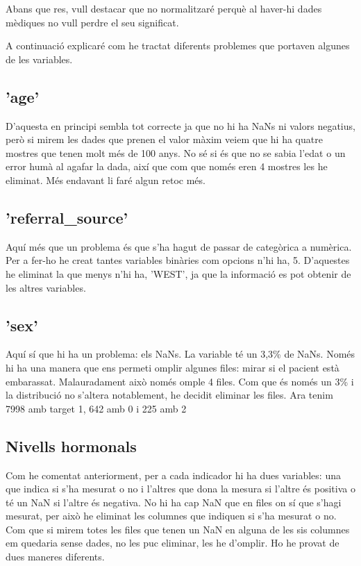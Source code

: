 \documentclass[9pt,a4paper,twoside]{tau-class/tau}
\begin{document}
    Abans que res, vull destacar que no normalitzaré perquè al haver-hi dades mèdiques no vull perdre el seu significat.

    A continuació explicaré com he tractat diferents problemes que portaven algunes de les variables.
    \subsection{'age'}
    D'aquesta en principi sembla tot correcte ja que no hi ha NaNs ni valors negatius, però si mirem les dades que prenen el valor màxim veiem que hi ha quatre mostres que tenen molt més de 100 anys. No sé si és que no se sabia l'edat o un error humà al agafar la dada, així que com que només eren 4 mostres les he eliminat. Més endavant li faré algun retoc més.

    \subsection{'referral\_source'}
    Aquí més que un problema és que s'ha hagut de passar de categòrica a numèrica. Per a fer-ho he creat tantes variables binàries com opcions n'hi ha, 5. D'aquestes he eliminat la que menys n'hi ha, 'WEST', ja que la informació es pot obtenir de les altres variables.

    \subsection{'sex'}
    Aquí sí que hi ha un problema: els NaNs. La variable té un 3,3\% de NaNs. Només hi ha una manera que ens permeti omplir algunes files: mirar si el pacient està embarassat. Malauradament això només omple 4 files. Com que és només un 3\% i la distribució no s'altera notablement, he decidit eliminar les files. Ara tenim 7998 amb target 1, 642 amb 0 i 225 amb 2

    \subsection{Nivells hormonals}
    Com he comentat anteriorment, per a cada indicador hi ha dues variables: una que indica si s'ha mesurat o no i l'altres que dona la mesura si l'altre és positiva o té un NaN si l'altre és negativa. No hi ha cap NaN que en files on sí que s'hagi mesurat, per això he eliminat les columnes que indiquen si s'ha mesurat o no. Com que si mirem totes les files que tenen un NaN en alguna de les sis columnes em quedaria sense dades, no les puc eliminar, les he d'omplir. Ho he provat de dues maneres diferents.
\end{document}
